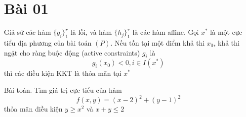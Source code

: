 \section{Bài 01}


\begin{corollary}{1}
    \label{coro:slater}
    Giả sử các hàm $\{g_i \}_1^r$ là lồi, và hàm $\{h_j \}_1^r$ là các hàm affine. Gọi $x^*$ là một cực tiểu địa phương của bài toán $(P)$. Nếu tồn tại một điểm khả thi $x_0$, khả thi ngặt cho ràng buộc động (active constraints) $g_i$ là 
    \begin{equation}
        g_i(x_0) < 0, i \in I(x^*)
    \end{equation}
    thì các điều kiện KKT là thỏa mãn tại $x^*$
\end{corollary}

Bài toán. Tìm giá trị cực tiểu của hàm 
\begin{equation}
    f(x, y) = (x-2)^2 + (y-1)^2
\end{equation}
thỏa mãn điều kiện $y \geq x^2$ và $x + y \leq 2$

